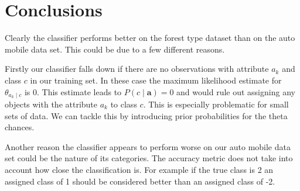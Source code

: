 \section{Conclusions}

Clearly the classifier performs better on the forest type dataset than on the auto mobile data set. This could be due to a few different reasons.

Firstly our classifier falls down if there are no observations with attribute $a_k$ and class $c$ in our training set. In these case the maximum likelihood estimate for $\theta_{a_k \mid c}$ is 0. This estimate leads to $P(c \mid \mathbf{a}) = 0$ and would rule out assigning any objects with the attribute $a_k$ to class $c$. This is especially problematic for small sets of data. We can tackle this by introducing prior probabilities for the theta chances.

Another reason the classifier appears to perform worse on our auto mobile data set could be the nature of its categories. The accuracy metric does not take into account how close the classification is. For example if the true class is 2 an assigned class of 1 should be considered better than an assigned class of -2.

